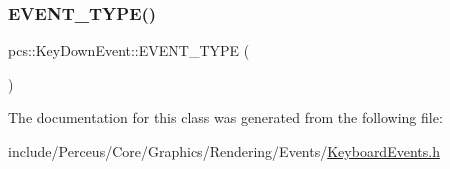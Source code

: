 \subsubsection{\texorpdfstring{E\+V\+E\+N\+T\+\_\+\+T\+Y\+P\+E()}{EVENT\_TYPE()}}
{\footnotesize\ttfamily pcs\+::\+Key\+Down\+Event\+::\+E\+V\+E\+N\+T\+\_\+\+T\+Y\+PE (\begin{DoxyParamCaption}\item[{\hyperlink{namespacepcs_a12954f53e3d7d6a8765fd723e1ce8db4acfd07bf1effd88bca04a12a087777354}{Key\+Down}}]{ }\end{DoxyParamCaption})}



The documentation for this class was generated from the following file\+:\begin{DoxyCompactItemize}
\item 
include/\+Perceus/\+Core/\+Graphics/\+Rendering/\+Events/\hyperlink{KeyboardEvents_8h}{Keyboard\+Events.\+h}\end{DoxyCompactItemize}
